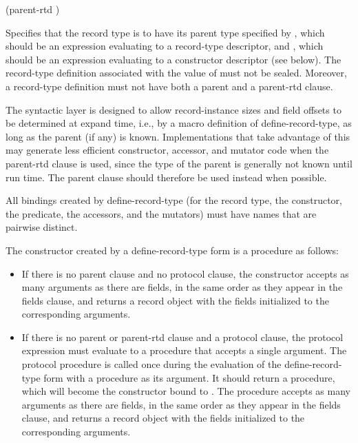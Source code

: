 \begin{entry}
{\cf (parent-rtd  )}

Specifies that the record type is to have its parent type specified by
, which should be an expression evaluating to a
record-type descriptor, and , which should be an
expression evaluating to a constructor descriptor (see below).  The
record-type definition associated with the value of 
must not be sealed.  Moreover, a record-type definition must not have
both a {\cf parent} and a {\cf parent-rtd} clause.

\begin{note}
  The syntactic layer is designed to allow record-instance sizes and field
  offsets to be determined at expand time, i.e., by a macro definition of
  {\cf define-record-type}, as long as the parent (if any) is known.
  Implementations that take advantage of this may generate less
  efficient constructor, accessor, and mutator code when the
  {\cf parent-rtd} clause is used, since the type of the parent is
  generally not known until run time.
  The {\cf parent} clause should therefore be used instead when possible.
\end{note}

All bindings created by {\cf define-record-type} (for the record type,
the constructor, the predicate, the accessors, and the
mutators) must have names that are pairwise distinct.

The constructor created by a {\cf define-record-type} form is a
procedure as follows:
%
\begin{itemize}
\item If there is no {\cf parent} clause and no {\cf protocol} clause,
  the constructor accepts as many arguments as there are fields, in
  the same order as they appear in the {\cf fields} clause, and
  returns a record object with the fields initialized to the
  corresponding arguments.
\item If there is no {\cf parent} or {\cf parent-rtd} clause and a
  {\cf protocol} clause,
  the protocol expression must evaluate to a procedure that accepts a
  single argument.  The protocol procedure is called once during the
  evaluation of the {\cf define-record-type} form with a
  procedure  as its argument.  It should return a procedure,
  which will become the constructor bound to .
  The procedure  accepts as many arguments as there are fields,
  in the same order as they appear in the {\cf fields} clause, and
  returns a record object with the fields initialized to the
  corresponding arguments.


\end{itemize}
\end{entry}
